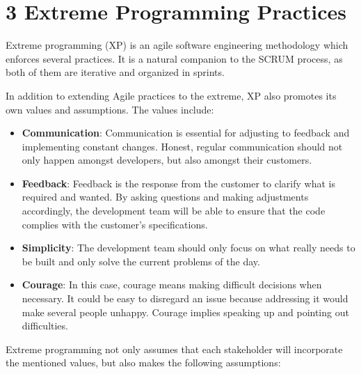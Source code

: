 \documentclass[]{article}
\begin{document}
\section{3 Extreme Programming
Practices}\label{extreme-programming-practices}

Extreme programming (XP) is an agile software engineering methodology
which enforces several practices. It is a natural companion to the SCRUM
process, as both of them are iterative and organized in sprints.

In addition to extending Agile practices to the extreme, XP also
promotes its own values and assumptions. The values include:

\begin{itemize}
\itemsep1pt\parskip0pt
\item
  \textbf{Communication}: Communication is essential for adjusting to
  feedback and implementing constant changes. Honest, regular
  communication should not only happen amongst developers, but also
  amongst their customers.
\item
  \textbf{Feedback}: Feedback is the response from the customer to
  clarify what is required and wanted. By asking questions and making
  adjustments accordingly, the development team will be able to ensure
  that the code complies with the customer's specifications.
\item
  \textbf{Simplicity}: The development team should only focus on what
  really needs to be built and only solve the current problems of the
  day.
\item
  \textbf{Courage}: In this case, courage means making difficult
  decisions when necessary. It could be easy to disregard an issue
  because addressing it would make several people unhappy. Courage
  implies speaking up and pointing out difficulties.
\end{itemize}

Extreme programming not only assumes that each stakeholder will
incorporate the mentioned values, but also makes the following
assumptions:
\end{document}
